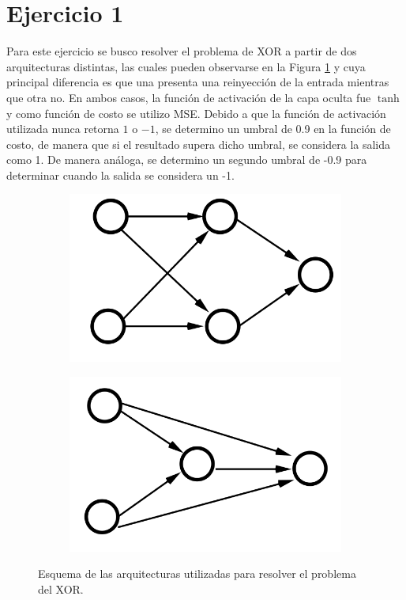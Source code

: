 \section*{Ejercicio 1}
\graphicspath{{Figuras/}}

Para este ejercicio se busco resolver el problema de XOR a partir de dos arquitecturas distintas, las cuales pueden observarse en la Figura \ref{fig:1_Arquitecturas} y cuya principal diferencia es que una presenta una reinyección de la entrada mientras que otra no. En ambos casos, la función de activación de la capa oculta fue $\tanh$ y como función de costo se utilizo MSE. Debido a que la función de activación utilizada nunca retorna $1$ o $-1$, se determino un umbral de 0.9 en la función de costo, de manera que si el resultado supera dicho umbral, se considera la salida como 1. De manera análoga, se determino un segundo umbral de -0.9 para determinar cuando la salida se considera un -1.

\begin{figure}[h!]
    \centering
    \begin{subfigure}[h]{0.3\textwidth} 
        \includegraphics[width=\textwidth]{Figuras/ejer_1_221.png}
    \end{subfigure}       
    \begin{subfigure}[h]{0.3\textwidth} 
        \includegraphics[width=\textwidth]{Figuras/ejer_1_211.png}
    \end{subfigure}
    \caption{Esquema de las arquitecturas utilizadas para resolver el problema del XOR.} \label{fig:1_Arquitecturas}
\end{figure}

